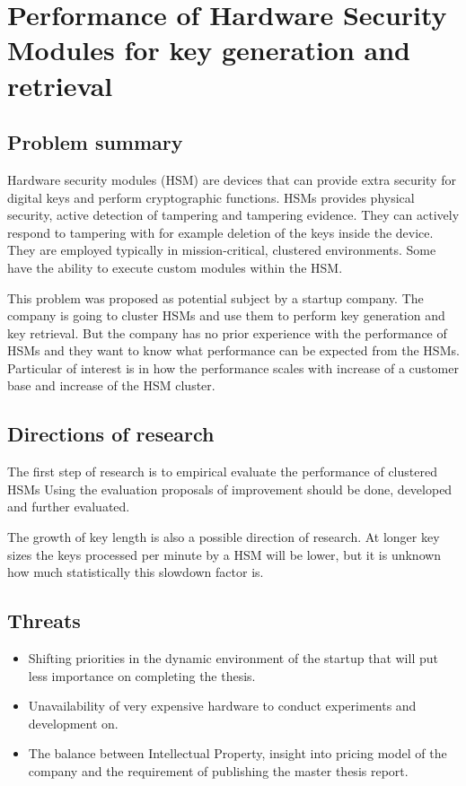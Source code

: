 \section{Performance of Hardware Security Modules for key generation and retrieval}

\subsection*{Problem summary}
Hardware security modules (HSM) are devices that can provide extra security for digital keys and perform cryptographic functions.
HSMs provides physical security, active detection of tampering and tampering evidence. 
They can actively respond to tampering with for example deletion of the keys inside the device.
They are employed typically in mission-critical, clustered environments.
Some have the ability to execute custom modules within the HSM.

This problem was proposed as potential subject by a startup company.
The company is going to cluster HSMs and use them to perform key generation and key retrieval.
But the company has no prior experience with the performance of HSMs
and they want to know what performance can be expected from the HSMs.
Particular of interest is in how the performance scales with increase of a customer base and increase of the HSM cluster.

\subsection*{Directions of research}
The first step of research is to empirical evaluate the performance of clustered HSMs 
Using the evaluation proposals of improvement should be done, developed and further evaluated.

The growth of key length is also a possible direction of research. 
At longer key sizes the keys processed per minute by a HSM will be lower,
but it is unknown how much statistically this slowdown factor is. 

\subsection*{Threats}
\begin{itemize}
\item Shifting priorities in the dynamic environment of the startup that will put less importance on completing the thesis.
\item Unavailability of very expensive hardware to conduct experiments and development on.
\item The balance between Intellectual Property, insight into pricing model of the company and the requirement of publishing the master thesis report.
\end{itemize}

